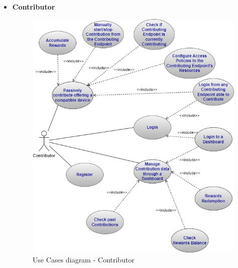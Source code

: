 \begin{itemize}
\item \textbf{Contributor}
\begin{figure}[!ht]
    \centering
    \includegraphics[scale=0.62]{document/chapters/chapter_5/images/contributor_use_cases.jpg}
    \caption{Use Cases diagram - Contributor}
    \label{fig:use_cases_contributor}
\end{figure}


\end{itemize}
